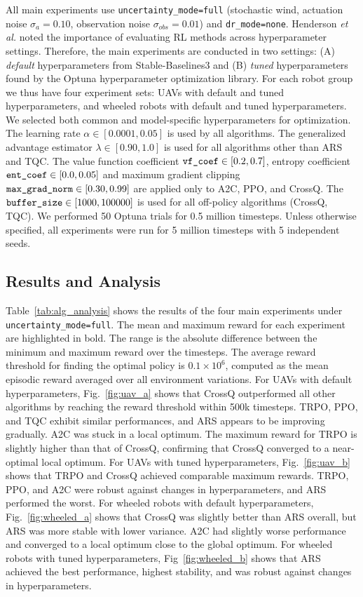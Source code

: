 \documentclass{article}
\begin{document}
All main experiments use \texttt{uncertainty\_mode=full} (stochastic wind, actuation noise $\sigma_a=0.10$, observation noise $\sigma_{obs}=0.01$) and \texttt{dr\_mode=none}. Henderson \textit{et al.}\cite{henderson2018deep} noted the importance of evaluating RL methods across hyperparameter settings. Therefore, the main experiments are conducted in two settings: (A) \emph{default} hyperparameters from Stable-Baselines3 and (B) \emph{tuned} hyperparameters found by the Optuna \cite{optuna_2019} hyperparameter optimization library. For each robot group we thus have four experiment sets: UAVs with default and tuned hyperparameters, and wheeled robots with default and tuned hyperparameters. We selected both common and model-specific hyperparameters for optimization. The learning rate $\alpha \in [0.0001, 0.05]$ is used by all algorithms. The generalized advantage estimator $\lambda \in [0.90, 1.0]$ is used for all algorithms other than ARS and TQC. The value function coefficient $\verb|vf_coef| \in [0.2, 0.7]$, entropy coefficient $\verb|ent_coef| \in [0.0, 0.05]$ and maximum gradient clipping $\verb|max_grad_norm| \in [0.30, 0.99]$ are applied only to A2C, PPO, and CrossQ. The $\verb|buffer_size| \in [1000, 100000]$ is used for all off-policy algorithms (CrossQ, TQC). We performed 50 Optuna trials for 0.5 million timesteps. Unless otherwise specified, all experiments were run for 5 million timesteps with 5 independent seeds.

\subsection{Results and Analysis}
Table~\ref{tab:alg_analysis} shows the results of the four main experiments under \texttt{uncertainty\_mode=full}. The mean and maximum reward for each experiment are highlighted in bold. The range is the absolute difference between the minimum and maximum reward over the timesteps. The average reward threshold for finding the optimal policy is $0.1 \times 10^6$, computed as the mean episodic reward averaged over all environment variations. For UAVs with default hyperparameters, Fig.~\ref{fig:uav_a} shows that CrossQ outperformed all other algorithms by reaching the reward threshold within 500k timesteps. TRPO, PPO, and TQC exhibit similar performances, and ARS appears to be improving gradually. A2C was stuck in a local optimum. The maximum reward for TRPO is slightly higher than that of CrossQ, confirming that CrossQ converged to a near-optimal local optimum. For UAVs with tuned hyperparameters, Fig.~\ref{fig:uav_b} shows that TRPO and CrossQ achieved comparable maximum rewards. TRPO, PPO, and A2C were robust against changes in hyperparameters, and ARS performed the worst. For wheeled robots with default hyperparameters, Fig.~\ref{fig:wheeled_a} shows that CrossQ was slightly better than ARS overall, but ARS was more stable with lower variance. A2C had slightly worse performance and converged to a local optimum close to the global optimum. For wheeled robots with tuned hyperparameters, Fig~\ref{fig:wheeled_b} shows that ARS achieved the best performance, highest stability, and was robust against changes in hyperparameters.
\end{document}
